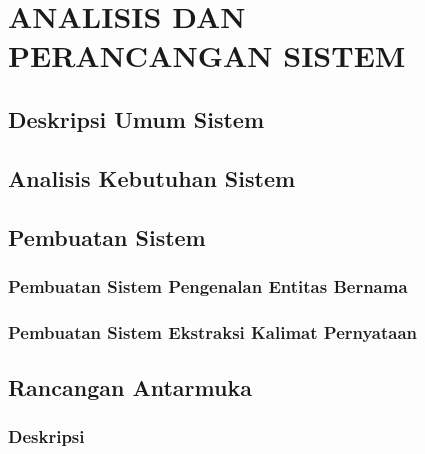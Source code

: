 \documentclass[ugmtesis]{ugmtesis}
\begin{document}
	



\chapter{ANALISIS DAN PERANCANGAN SISTEM}
\label{ANALISIS DAN PERANCANGAN SISTEM}

	\section{Deskripsi Umum Sistem}
	\label{rancangan deskripsi umum sistem}
	

	\section{Analisis Kebutuhan Sistem}
	\label{rancangan analisis kebutuhan sistem}
	

	\section{Pembuatan Sistem}
	\label{rancangan pembuatan sistem}

		\subsection{Pembuatan Sistem Pengenalan Entitas Bernama}
		\label{rancangan pembuatan sistem pengenalan entitas bernama}
		

		\subsection{Pembuatan Sistem Ekstraksi Kalimat Pernyataan}
		\label{rancangan sistem ekstraksi kalimat pernyataan}
		

	\section{Rancangan Antarmuka}
	\label{rancangan antarmuka}

		\subsection{Deskripsi}
		\label{rancangan deskripsi antarmuka}
		
\end{document}
